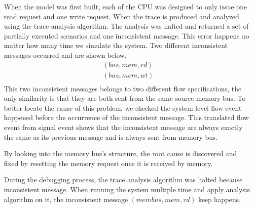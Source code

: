 \documentclass[12pt,frontmatter,copyright,thesis]{usfmanus}
\begin{document}

When the model was first built, each of the CPU was designed to only issue one
read request and one write request. When the trace is produced and analyzed using
the trace analysis algorithm. The analysis was halted and returned a set of partially
executed scenarios and one inconsistent message. This error happens no matter
how many time we simulate the system.
Two different inconsistent messages occurred and are shown below.
\[
 \begin{array}{l}
(bus, mem, rd)\\
(bus, mem, wt)\\
\end{array}
\] 
This two inconsistent messages belongs to two different flow specifications,
the only similarity is that they are both sent from the same source memory bus.
To better locate the cause of this problem, we checked the system level flow event
happened before the occurrence of the inconsistent message. 
This translated flow event from signal event shows that the inconsistent
message are always exactly the same as its previous message
and is always sent from memory bus.

By looking into the memory bus's structure, the root cause is discovered and 
fixed by resetting the memory request once it is received by memory.


During the debugging process, the trace analysis algorithm was halted because
inconsistent message.
When running the system multiple time and apply analysis algorithm on it,
the inconsistent message $(membus, mem, rd)$ keep happens.
\end{document}
